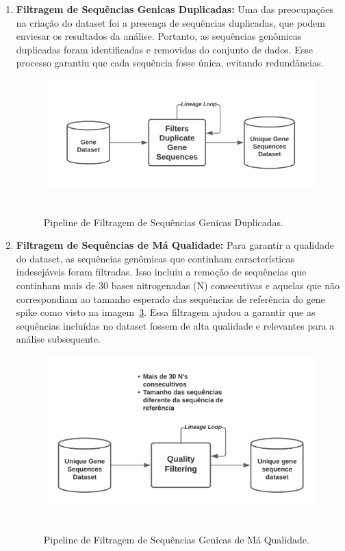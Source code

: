 \begin{enumerate}
\begin{figure}[htb]
          ~\label{fig:extracaoSpike}
        \end{figure}
  \item \textbf{Filtragem de Sequências Genicas Duplicadas:} Uma das preocupações na criação do dataset foi a presença de sequências duplicadas, que podem enviesar os resultados da análise. Portanto, as sequências genômicas duplicadas foram identificadas e removidas do conjunto de dados. Esse processo garantiu que cada sequência fosse única, evitando redundâncias.
        \begin{figure}[htb]
          \centering
          \caption{Pipeline de Filtragem de Sequências Genicas Duplicadas.}
          \includegraphics[scale=0.45]{figuras/pipelines/filtrando_spikes_duplicados.png}
          ~\label{fig:spikeDuplicados}
        \end{figure}
  \item \textbf{Filtragem de Sequências de Má Qualidade:} Para garantir a qualidade do dataset, as sequências genômicas que continham características indesejáveis foram filtradas. Isso incluiu a remoção de sequências que continham mais de 30 bases nitrogenadas (N) consecutivas e aquelas que não correspondiam ao tamanho esperado das sequências de referência do gene spike como visto na imagem~\ref{fig:spikesRuins}. Essa filtragem ajudou a garantir que as sequências incluídas no dataset fossem de alta qualidade e relevantes para a análise subsequente.
        \begin{figure}[htb]
          \centering
          \caption{Pipeline de Filtragem de Sequências Genicas de Má Qualidade.}
          \includegraphics[scale=0.45]{figuras/pipelines/filtrando_spikes_ruins.png}
          ~\label{fig:spikesRuins}
        \end{figure}
\end{enumerate}

